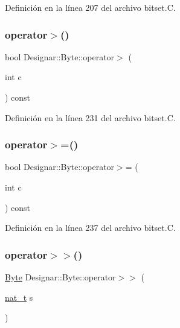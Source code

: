 Definición en la línea 207 del archivo bitset.\+C.

\mbox{\label{class_designar_1_1_byte_afa7138b57841b2a8f64c209ae3d79447}} 
\subsubsection{\texorpdfstring{operator$>$()}{operator>()}}
{\footnotesize\ttfamily bool Designar\+::\+Byte\+::operator$>$ (\begin{DoxyParamCaption}\item[{int}]{c }\end{DoxyParamCaption}) const}



Definición en la línea 231 del archivo bitset.\+C.

\mbox{\label{class_designar_1_1_byte_a84d13e39d56aa1a32db48af56c9dae21}} 
\subsubsection{\texorpdfstring{operator$>$=()}{operator>=()}}
{\footnotesize\ttfamily bool Designar\+::\+Byte\+::operator$>$= (\begin{DoxyParamCaption}\item[{int}]{c }\end{DoxyParamCaption}) const}



Definición en la línea 237 del archivo bitset.\+C.

\mbox{\label{class_designar_1_1_byte_a72ab991a6878042fd48a2d5b39e15034}} 
\subsubsection{\texorpdfstring{operator$>$$>$()}{operator>>()}}
{\footnotesize\ttfamily \hyperlink{class_designar_1_1_byte}{Byte} Designar\+::\+Byte\+::operator$>$$>$ (\begin{DoxyParamCaption}\item[{\hyperlink{namespace_designar_aa72662848b9f4815e7bf31a7cf3e33d1}{nat\+\_\+t}}]{s }\end{DoxyParamCaption})}



